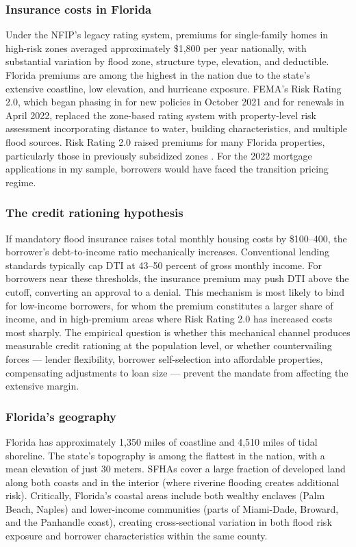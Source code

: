 \documentclass[12pt]{article}
\begin{document}
\subsubsection*{Insurance costs in Florida} Under the NFIP's legacy rating system, premiums for single-family homes in high-risk zones averaged approximately \$1,800 per year nationally, with substantial variation by flood zone, structure type, elevation, and deductible. Florida premiums are among the highest in the nation due to the state's extensive coastline, low elevation, and hurricane exposure. FEMA's Risk Rating 2.0, which began phasing in for new policies in October 2021 and for renewals in April 2022, replaced the zone-based rating system with property-level risk assessment incorporating distance to water, building characteristics, and multiple flood sources. Risk Rating 2.0 raised premiums for many Florida properties, particularly those in previously subsidized zones \citep{naic2022flood}. For the 2022 mortgage applications in my sample, borrowers would have faced the transition pricing regime.

\subsubsection*{The credit rationing hypothesis} If mandatory flood insurance raises total monthly housing costs by \$100--400, the borrower's debt-to-income ratio mechanically increases. Conventional lending standards typically cap DTI at 43--50 percent of gross monthly income. For borrowers near these thresholds, the insurance premium may push DTI above the cutoff, converting an approval to a denial. This mechanism is most likely to bind for low-income borrowers, for whom the premium constitutes a larger share of income, and in high-premium areas where Risk Rating 2.0 has increased costs most sharply. The empirical question is whether this mechanical channel produces measurable credit rationing at the population level, or whether countervailing forces --- lender flexibility, borrower self-selection into affordable properties, compensating adjustments to loan size --- prevent the mandate from affecting the extensive margin.

\subsubsection*{Florida's geography} Florida has approximately 1,350 miles of coastline and 4,510 miles of tidal shoreline. The state's topography is among the flattest in the nation, with a mean elevation of just 30 meters. SFHAs cover a large fraction of developed land along both coasts and in the interior (where riverine flooding creates additional risk). Critically, Florida's coastal areas include both wealthy enclaves (Palm Beach, Naples) and lower-income communities (parts of Miami-Dade, Broward, and the Panhandle coast), creating cross-sectional variation in both flood risk exposure and borrower characteristics within the same county.
\end{document}
